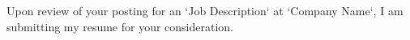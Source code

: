 \documentclass[11pt, a4paper]{awesome-cv}
\begin{document}
\begin{cvletter}
Upon review of your posting for an `Job Description` at `Company Name`, I am submitting my resume for your consideration.

\end{cvletter}

\makeletterclosing
\end{document}
